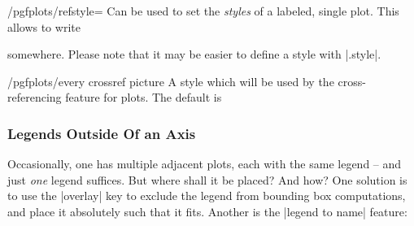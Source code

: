 \begin{key}{/pgfplots/refstyle=}
	Can be used to set the \emph{styles} of a labeled, single plot. This allows to write
\begin{codeexample}
\addplot[/pgfplots/refstyle={pgfplots:label2}]
\end{codeexample}
	\noindent somewhere. Please note that it may be easier to define a style with |.style|.
\end{key}

\begin{stylekey}{/pgfplots/every crossref picture}
	A style which will be used by the cross-referencing feature for plots. The default is
\begin{codeexample}
\end{codeexample}
\end{stylekey}

\subsubsection{Legends Outside Of an Axis}
Occasionally, one has multiple adjacent plots, each with the same legend -- and just \emph{one} legend suffices. But where shall it be placed? And how? One solution is to use the |overlay| key to exclude the legend from bounding box computations, and place it absolutely such that it fits. Another is the |legend to name| feature:

